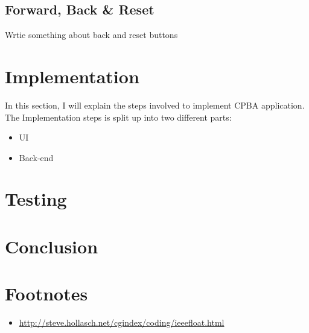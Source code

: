 \documentclass[11pt]{article}
\begin{document}
\subsection{Forward, Back \& Reset}
Wrtie something about back and reset buttons 
\newpage



\section{Implementation}
In this section, I will explain the steps involved to implement CPBA application. The Implementation steps is split up into two different parts:
\begin{itemize}
\item UI
\item Back-end
\end{itemize}
\section{Testing}



\section{Conclusion}

\section*{Footnotes}
\begin{itemize}
\item \url{http://steve.hollasch.net/cgindex/coding/ieeefloat.html}
\end{itemize}
\appendix
\begin{appendices}

\end{appendices}
\end{document}
